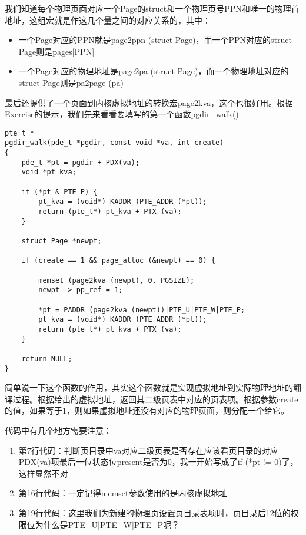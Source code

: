 \documentclass{article}
\newcommand{\funcname}[1]{{\ttfamily \small #1}}
\begin{document}
\begin{CJK*}{UTF8}{gkai}
我们知道每个物理页面对应一个Page的struct和一个物理页号PPN和唯一的物理首地址，这组宏就是作这几个量之间的对应关系的，其中：

\begin{itemize}
\item{一个Page对应的PPN就是page2ppn (struct \hspace{0.5ex}Page)，而一个PPN对应的struct \hspace{0.5ex}Page则是pages[PPN]}
\item{一个Page对应的物理地址是page2pa (struct \hspace{0.5ex}Page)，而一个物理地址对应的struct \hspace{0.5ex}Page则是pa2page (pa)}
\end{itemize}

最后还提供了一个页面到内核虚拟地址的转换宏page2kva，这个也很好用。根据Exercise的提示，我们先来看看要填写的第一个函数\funcname{pgdir\_walk()}



\begin{lstlisting}[style=ccode, title={\scriptsize \ttfamily \bfseries kern/pmap.c: pgdir\_walk ()}]
pte_t *
pgdir_walk(pde_t *pgdir, const void *va, int create)
{
    pde_t *pt = pgdir + PDX(va);
    void *pt_kva;

    if (*pt & PTE_P) {
        pt_kva = (void*) KADDR (PTE_ADDR (*pt));
        return (pte_t*) pt_kva + PTX (va);
    }

    struct Page *newpt;

    if (create == 1 && page_alloc (&newpt) == 0) {
    
        memset (page2kva (newpt), 0, PGSIZE);
        newpt -> pp_ref = 1;

        *pt = PADDR (page2kva (newpt))|PTE_U|PTE_W|PTE_P;
        pt_kva = (void*) KADDR (PTE_ADDR (*pt));
        return (pte_t*) pt_kva + PTX (va);
    }

    return NULL;
}
\end{lstlisting}

简单说一下这个函数的作用，其实这个函数就是实现虚拟地址到实际物理地址的翻译过程。根据给出的虚拟地址，返回其二级页表中对应的页表项。根据参数create的值，如果等于1，则如果虚拟地址还没有对应的物理页面，则分配一个给它。

代码中有几个地方需要注意：

\begin{enumerate}
\item{第7行代码：判断页目录中va对应二级页表是否存在应该看页目录的对应PDX(va)项最后一位状态位present是否为0，我一开始写成了if (*pt != 0)了，这样显然不对}
\item{第16行代码：一定记得memset参数使用的是内核虚拟地址}
\item{第19行代码：这里我们为新建的物理页设置页目录表项时，页目录后12位的权限位为什么是PTE\_U$\left|\right.$PTE\_W$\left|\right.$PTE\_P呢？}
\end{enumerate}


\end{CJK*}
\end{document}
